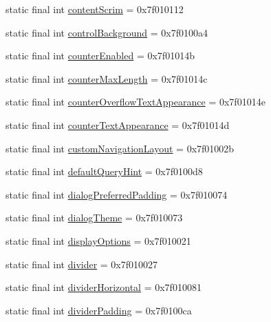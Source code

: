\begin{CompactItemize}
\item 
static final int \hyperlink{classandroid_1_1support_1_1mediacompat_1_1_r_1_1attr_9fb934987aa3cac98e57c45e3cf6eeeb}{contentScrim} = 0x7f010112
\item 
static final int \hyperlink{classandroid_1_1support_1_1mediacompat_1_1_r_1_1attr_14425b2c6c7ececcac7d52d4fee4a28e}{controlBackground} = 0x7f0100a4
\item 
static final int \hyperlink{classandroid_1_1support_1_1mediacompat_1_1_r_1_1attr_c446e6cebed1564c5f09813910f03aa4}{counterEnabled} = 0x7f01014b
\item 
static final int \hyperlink{classandroid_1_1support_1_1mediacompat_1_1_r_1_1attr_84286f5743df750f3e0cb1e9f5cb57bf}{counterMaxLength} = 0x7f01014c
\item 
static final int \hyperlink{classandroid_1_1support_1_1mediacompat_1_1_r_1_1attr_2b2731d2577cd123313ef9f76b301936}{counterOverflowTextAppearance} = 0x7f01014e
\item 
static final int \hyperlink{classandroid_1_1support_1_1mediacompat_1_1_r_1_1attr_67588c3096dfd8014f1b37b162f8f38c}{counterTextAppearance} = 0x7f01014d
\item 
static final int \hyperlink{classandroid_1_1support_1_1mediacompat_1_1_r_1_1attr_43db4388d063b5f80ad749b211a2d948}{customNavigationLayout} = 0x7f01002b
\item 
static final int \hyperlink{classandroid_1_1support_1_1mediacompat_1_1_r_1_1attr_235a41382c863edcb041c52b2148dbd7}{defaultQueryHint} = 0x7f0100d8
\item 
static final int \hyperlink{classandroid_1_1support_1_1mediacompat_1_1_r_1_1attr_fd086d0bd0e5879d8205312536956fc5}{dialogPreferredPadding} = 0x7f010074
\item 
static final int \hyperlink{classandroid_1_1support_1_1mediacompat_1_1_r_1_1attr_03492302bca9a27bf4f913e3951cc98a}{dialogTheme} = 0x7f010073
\item 
static final int \hyperlink{classandroid_1_1support_1_1mediacompat_1_1_r_1_1attr_73f96b4a380d1744c7fe30d61167551c}{displayOptions} = 0x7f010021
\item 
static final int \hyperlink{classandroid_1_1support_1_1mediacompat_1_1_r_1_1attr_2733cc3aa3348695aabab7c62befd9b8}{divider} = 0x7f010027
\item 
static final int \hyperlink{classandroid_1_1support_1_1mediacompat_1_1_r_1_1attr_cf698437200c3c1ffc72f98e39ab3456}{dividerHorizontal} = 0x7f010081
\item 
static final int \hyperlink{classandroid_1_1support_1_1mediacompat_1_1_r_1_1attr_6c0b96c90e342d591842e162e5556d63}{dividerPadding} = 0x7f0100ca

\end{CompactItemize}
